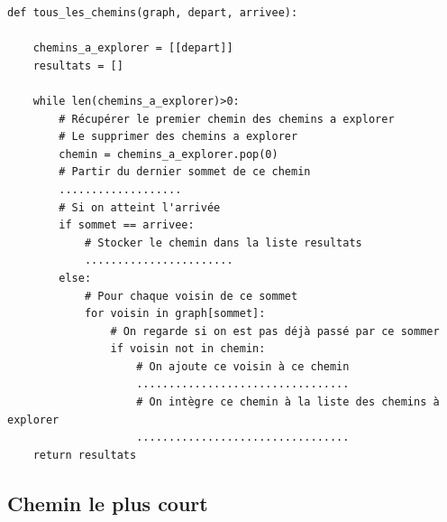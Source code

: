 
\begin{verbatim}
def tous_les_chemins(graph, depart, arrivee):

    chemins_a_explorer = [[depart]]
    resultats = []

    while len(chemins_a_explorer)>0:
        # Récupérer le premier chemin des chemins a explorer
        # Le supprimer des chemins a explorer
        chemin = chemins_a_explorer.pop(0)
        # Partir du dernier sommet de ce chemin
        ...................
        # Si on atteint l'arrivée
        if sommet == arrivee:
            # Stocker le chemin dans la liste resultats
            .......................
        else:
            # Pour chaque voisin de ce sommet
            for voisin in graph[sommet]:
                # On regarde si on est pas déjà passé par ce sommer
                if voisin not in chemin:
                    # On ajoute ce voisin à ce chemin
                    .................................
                    # On intègre ce chemin à la liste des chemins à explorer
                    .................................
    return resultats
\end{verbatim}

\subsection{Chemin le plus court}



